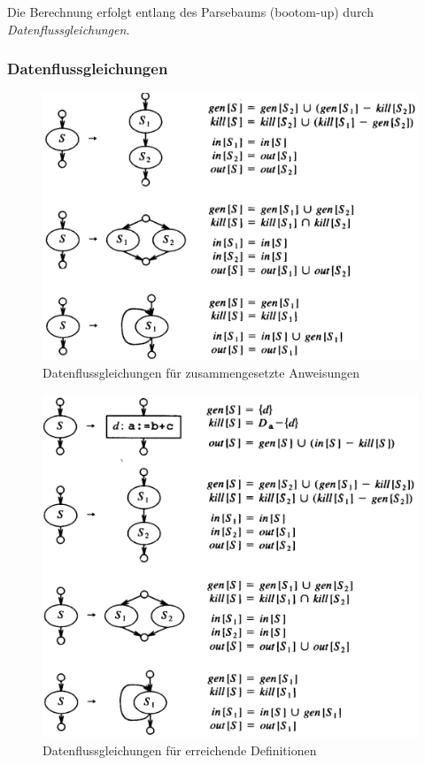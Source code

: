 Die Berechnung erfolgt entlang des Parsebaums (bootom-up) durch \emph{Datenflussgleichungen}.


\subsubsection{Datenflussgleichungen} %
\label{ssub:datenflussgleichungen}

\begin{figure}[!ht]
    \centering
    \includegraphics[scale=0.2]{images/bild0-2.png}
    \caption{Datenflussgleichungen für zusammengesetzte Anweisungen}
\end{figure}

\begin{figure}[!ht]
    \centering
    \includegraphics[scale=0.2]{images/bild1-3.png}
    \caption{Datenflussgleichungen für \glqq erreichende Definitionen\grqq\ }
\end{figure}

